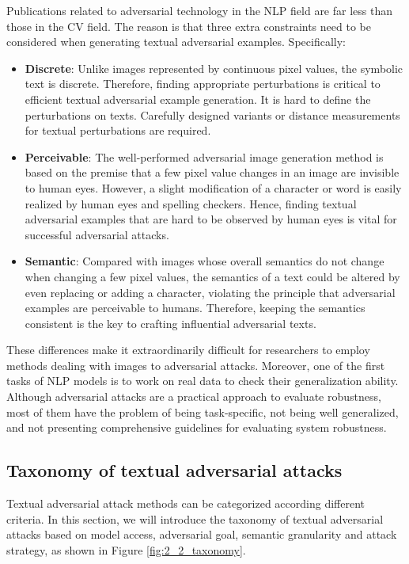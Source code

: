 Publications related to adversarial technology in the NLP field are far less than those in the CV field.
The reason is that three extra constraints need to be considered when generating textual adversarial examples. Specifically:
\begin{itemize}
    \item \textbf{Discrete}: Unlike images represented by continuous pixel values, the symbolic text is discrete. Therefore, finding appropriate perturbations is critical to efficient textual adversarial example generation. 
                             It is hard to define the perturbations on texts. Carefully designed variants or distance measurements for textual perturbations are required.
    \item \textbf{Perceivable}: The well-performed adversarial image generation method is based on the premise that a few pixel value changes in an image are invisible to human eyes. However, a slight modification of a character or word is easily realized by human eyes and spelling checkers. Hence, finding textual adversarial examples that are hard to be observed by human eyes is vital for successful adversarial attacks.
    \item \textbf{Semantic}: Compared with images whose overall semantics do not change when changing a few pixel values, the semantics of a text could be altered by even replacing or adding a character, violating the principle that adversarial examples are perceivable to humans. Therefore, keeping the semantics consistent is the key to crafting influential adversarial texts.
\end{itemize}

These differences make it extraordinarily difficult for
researchers to employ methods dealing with images to adversarial attacks. Moreover, one of the first tasks of NLP
models is to work on real data to check their generalization ability. Although adversarial attacks are a practical approach to evaluate robustness, most of them have the problem of being task-specific, not being well generalized, and not presenting comprehensive guidelines for evaluating system robustness.

\subsection{Taxonomy of textual adversarial attacks}\label{subsec:taxonomy-textual-adversarial-attacks}

Textual adversarial attack methods can be categorized according different criteria. In this section, we will introduce the taxonomy of textual adversarial attacks based on model access, adversarial goal, semantic granularity and attack strategy, as shown in Figure \ref{fig:2_2_taxonomy}.

